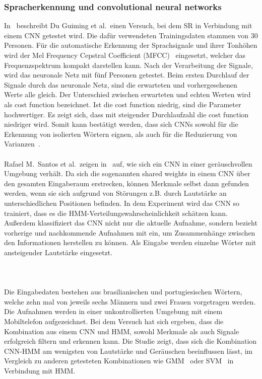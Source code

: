 \subsubsection{Spracherkennung und convolutional neural networks}
In~\cite{usingcnn} beschreibt Du Guiming et al.~einen Versuch, bei dem SR in Verbindung mit einem CNN getestet wird. Die dafür verwendeten Trainingsdaten stammen von 30 Personen. Für die automatische Erkennung der Sprachsignale und ihrer Tonhöhen wird der Mel Frequency Cepstral Coefficient (MFCC)~\cite{MFCC} eingesetzt, welcher das Frequenzspektrum kompakt darstellen kann. Nach der Verarbeitung der Signale, wird das neuronale Netz mit fünf Personen getestet. Beim ersten Durchlauf der Signale durch das neuronale Netz, sind die erwarteten und vorhergesehenen Werte alle gleich. Der Unterschied zwi\-schen erwarteten und echten Werten wird als cost function bezeichnet. Ist die cost function niedrig, sind die Parameter hochwertiger. Es zeigt sich, dass mit steigender Durchlaufzahl die cost function niedriger wird. Somit kann bestätigt werden, dass sich CNNs sowohl für die Erkennung von isolierten Wörtern eignen, als auch für die Reduzierung von Varianzen~\cite{usingcnn}.\\
\\
Rafael M.~Santos et al.~zeigen in~\cite{noisycnn} auf, wie sich ein CNN in einer geräuschvol\-len Umgebung verhält. Da sich die sogenannten shared weights in einem CNN über den gesamten Eingaberaum erstrecken, können Merkmale selbst dann gefunden werden, wenn sie sich aufgrund von Störungen z.B. durch Lautstärke an unterschiedlichen Positionen befinden. In dem Experiment wird das CNN so trainiert, dass es die HMM-Verteilungswahrscheinlich\-keit schätzen kann. Außerdem klassifiziert das CNN nicht nur die aktuelle Aufnahme, sondern bezieht vorherige und nachkommende Aufnahmen mit ein, um Zusammenhän\-ge zwischen den Informationen herstellen zu können. Als Eingabe werden einzel\-ne Wörter mit ansteigender Lautstärke eingesetzt.
\\
\\
\\
\\
Die Eingabedaten bestehen aus brasilianischen und portugiesischen Wörtern, welche zehn mal von jeweils sechs Männern und zwei Frauen vorgetragen werden. Die Aufnahmen werden in einer unkontrollierten Umgebung mit einem Mobiltelefon aufgezeichnet. Bei dem Versuch hat sich ergeben, dass die Kombination aus einem CNN und HMM, sowohl Merkmale als auch Signale erfolgreich filtern und erkennen kann. Die Studie zeigt, dass sich die Kombination CNN-HMM am wenigsten von Lautstärke und Geräuschen beeinflussen lässt, im Vergleich zu anderen getesteten Kombinationen wie GMM~\cite{svmgmm} oder SVM~\cite{svmgmm} in Verbindung mit HMM.

